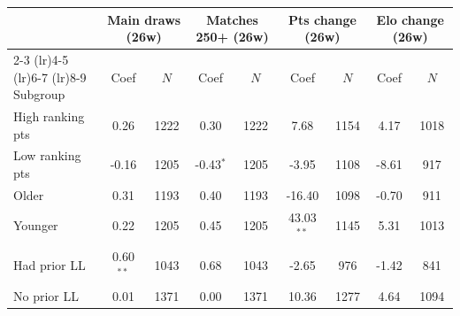 \begin{tabular}{l cc cc cc cc}
\toprule
 & \multicolumn{2}{c}{Main draws (26w)} & \multicolumn{2}{c}{Matches 250+ (26w)} & \multicolumn{2}{c}{Pts change (26w)} & \multicolumn{2}{c}{Elo change (26w)} \\
\cmidrule(lr){2-3} \cmidrule(lr){4-5} \cmidrule(lr){6-7} \cmidrule(lr){8-9}
Subgroup & Coef & $N$ & Coef & $N$ & Coef & $N$ & Coef & $N$ \\
\midrule
High ranking pts & 0.26 & 1222 & 0.30 & 1222 & 7.68 & 1154 & 4.17 & 1018 \\
Low ranking pts & -0.16 & 1205 & -0.43$^{*}$ & 1205 & -3.95 & 1108 & -8.61 & 917 \\
Older & 0.31 & 1193 & 0.40 & 1193 & -16.40 & 1098 & -0.70 & 911 \\
Younger & 0.22 & 1205 & 0.45 & 1205 & 43.03$^{**}$ & 1145 & 5.31 & 1013 \\
Had prior LL & 0.60$^{**}$ & 1043 & 0.68 & 1043 & -2.65 & 976 & -1.42 & 841 \\
No prior LL & 0.01 & 1371 & 0.00 & 1371 & 10.36 & 1277 & 4.64 & 1094 \\
\bottomrule
\end{tabular}

